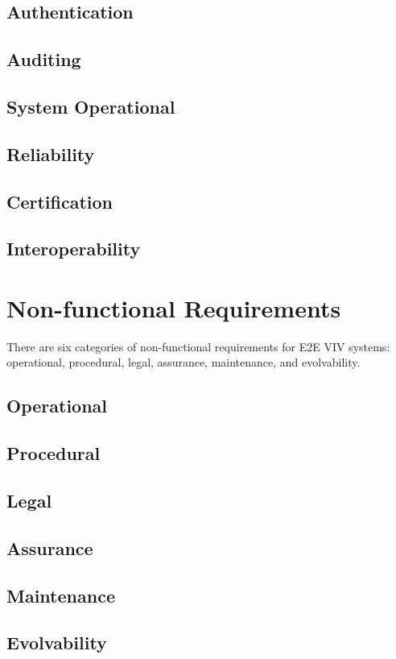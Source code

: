\subsection{Authentication}
\lipsum[6]
\subsection{Auditing}
\lipsum[7]
\subsection{System Operational}
\lipsum[8]
\subsection{Reliability}
\lipsum[9]
\subsection{Certification}
\lipsum[10]
\subsection{Interoperability}
\lipsum[11]

\section{Non-functional Requirements}
There are six categories of non-functional requirements for E2E VIV
systems: operational, procedural, legal, assurance, maintenance, and
evolvability.

\subsection{Operational}
\lipsum[13]

\subsection{Procedural}
\lipsum[14]

\subsection{Legal}
\lipsum[15]

\subsection{Assurance}
\lipsum[16]

\subsection{Maintenance}
\lipsum[17]

\subsection{Evolvability}
\lipsum[18]
